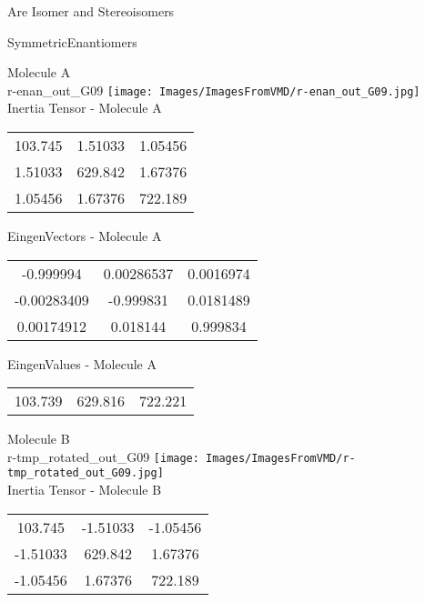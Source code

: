 \begin{center}
\vtab
\vtab
\textcolor{NavyBlue}{\Large Are Isomer and Stereoisomers}
\end{center}
\newpage

\vtab[-2cm]
\begin{center}
{\large SymmetricEnantiomers}
\end{center}
\begin{multicols}{2}
\begin{center}
Molecule A \\ 
r-enan\_out\_G09
\texttt{[image: Images/ImagesFromVMD/r-enan\_out\_G09.jpg]}
\\
Inertia Tensor - Molecule A \\
\vtab
\begin{tabular}{|c c c|}
103.745	 & 	1.51033	 & 	1.05456	 \\
1.51033	 & 	629.842	 & 	1.67376	 \\
1.05456	 & 	1.67376	 & 	722.189
\end{tabular}

\vtab
 EingenVectors - Molecule A     \\
\vtab
\begin{tabular}{|c c c|}
-0.999994	 & 	0.00286537	 & 	0.0016974	 \\
-0.00283409	 & 	-0.999831	 & 	0.0181489	 \\
0.00174912	 & 	0.018144	 & 	0.999834
\end{tabular}

\vtab
 EingenValues - Molecule A     \\
\vtab
\begin{tabular}{|c c c|}
103.739	 & 	629.816	 & 	722.221
\end{tabular}
\columnbreak

Molecule B \\ 
r-tmp\_rotated\_out\_G09
\texttt{[image: Images/ImagesFromVMD/r-tmp\_rotated\_out\_G09.jpg]}
\\
Inertia Tensor - Molecule B \\
\vtab
\begin{tabular}{|c c c|}
103.745	 & 	-1.51033	 & 	-1.05456	 \\
-1.51033	 & 	629.842	 & 	1.67376	 \\
-1.05456	 & 	1.67376	 & 	722.189
\end{tabular}


\end{center}
\end{multicols}

